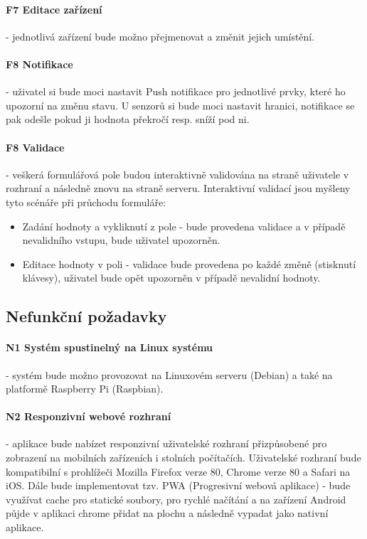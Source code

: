 \paragraph{F7 Editace zařízení}
- jednotlivá zařízení bude možno přejmenovat a změnit jejich umístění.

\paragraph{F8 Notifikace}
- uživatel si bude moci nastavit Push notifikace pro jednotlivé prvky, které ho upozorní na změnu stavu. U senzorů si bude moci nastavit hranici, notifikace se pak odešle pokud ji hodnota překročí resp. sníží pod ni.

\paragraph{F8 Validace}
- veškerá formulářová pole budou interaktivně validována na straně uživatele v rozhraní a následně znovu na straně serveru. Interaktivní validací jsou myšleny tyto scénáře při průchodu formuláře:
\begin{itemize}
    \item Zadání hodnoty a vykliknutí z pole - bude provedena validace a v případě nevalidního vstupu, bude uživatel upozorněn.
    \item Editace hodnoty v poli - validace bude provedena po každé změně (stisknutí klávesy), uživatel bude opět upozorněn v případě nevalidní hodnoty.
\end{itemize}


\subsection{Nefunkční požadavky}

\paragraph{N1 Systém spustinelný na Linux systému}
- systém bude možno provozovat na Linuxovém serveru (Debian) a také na platformě Raspberry Pi (Raspbian).

\paragraph{N2 Responzivní webové rozhraní}
- aplikace bude nabízet responzivní uživatelské rozhraní přizpůsobené pro zobrazení na mobilních zařízeních i stolních počítačích. Uživatelské rozhraní bude kompatibilní s prohlížeči Mozilla Firefox verze 80, Chrome verze 80 a Safari na iOS. Dále bude implementovat tzv. PWA (Progresivní webová aplikace) - bude využívat cache pro statické soubory, pro rychlé načítání a na zařízení Android půjde v aplikaci chrome přidat na plochu a následně vypadat jako nativní aplikace.

